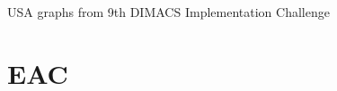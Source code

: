 
USA graphs from 9th DIMACS Implementation Challenge

%
%

% 

%
%

\section{EAC}
\label{sec:eac results}

